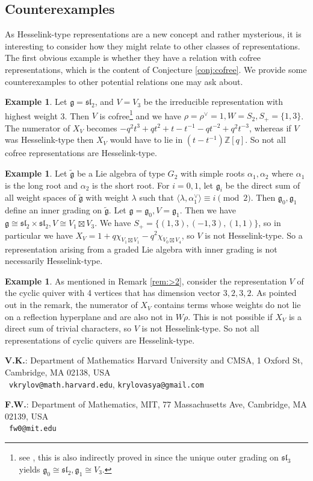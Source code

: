 \documentclass[12pt]{article}
\newcommand{\Z}{\mathbb{Z}}
\renewcommand{\sl}{\mathfrak{sl}}
\theoremstyle{definition}
\newtheorem{example}[theorem]{Example}
\theoremstyle{remark}
\newcommand{\g}{\mathfrak{g}}
\begin{document}
\subsection{Counterexamples}\label{sec:counter}

As Hesselink-type representations are a new concept and rather mysterious, it is interesting to consider how they might relate to other classes of representations. The first obvious example is whether they have a relation with cofree representations, which is the content of Conjecture \ref{conj:cofree}. We provide some counterexamples to other potential relations one may ask about.

\begin{example}
    Let $\g=\sl_2$, and $V=V_3$ be the irreducible representation with highest weight 3. Then $V$ is cofree\footnote{see \cite{littelmann}, this is also indirectly proved in \cite{vinberg} since the unique outer grading on $\sl_3$ yields $\g_0\cong\sl_2,\g_1\cong V_3$.} and we have $\rho=\rho^\vee=1,W=S_2,S_+=\{1,3\}$. The numerator of $X_V$ becomes $-q^2t^3+qt^2+t-t^{-1}-qt^{-2}+q^2t^{-3}$, whereas if $V$ was Hesselink-type then $X_V$ would have to lie in $(t-t^{-1})\Z[q]$. So not all cofree representations are Hesselink-type.
\end{example}

\begin{example}\label{eg:g2}
    Let $\tilde{\g}$ be a Lie algebra of type $G_2$ with simple roots $\alpha_1,\alpha_2$ where $\alpha_1$ is the long root and $\alpha_2$ is the short root. For $i=0,1$, let $\g_i$ be the direct sum of all weight spaces of $\tilde{\g}$ with weight $\lambda$ such that $\langle\lambda,\alpha_1^\vee\rangle\equiv i\pmod 2$. Then $\g_0,\g_1$ define an inner grading on $\tilde{\g}$. Let $\g=\g_0,V=\g_1$. Then we have $\g\cong\sl_2\times\sl_2, V\cong V_1\boxtimes V_3$. We have $S_+=\{(1,3),(-1,3),(1,1)\}$, so in particular we have $X_V=1+q\chi_{V_1\boxtimes V_1}-q^2\chi_{V_0\boxtimes V_4}$, so $V$ is not Hesselink-type. So a representation arising from a graded Lie algebra with inner grading is not necessarily Hesselink-type.
\end{example}

\begin{example}\label{eg:3232}
    As mentioned in Remark \ref{rem:>2}, consider the representation $V$ of the cyclic quiver with 4 vertices that has dimension vector $3,2,3,2$. As pointed out in the remark, the numerator of $X_V$ contains terms whose weights do not lie on a reflection hyperplane and are also not in $W\rho$. This is not possible if $X_V$ is a direct sum of trivial characters, so $V$ is not Hesselink-type. So not all representations of cyclic quivers are Hesselink-type.
\end{example}

\printbibliography

\footnotesize{
{\bf V.K.}: Department of Mathematics Harvard University and CMSA, 1 Oxford St, Cambridge, MA 02138, USA\\
\hphantom{x}\quad\, {\tt vkrylov@math.harvard.edu}, {\tt krylovasya@gmail.com}

{\bf F.W.}: Department of Mathematics, MIT,
77 Massachusetts Ave, Cambridge, MA 02139, USA\\
\hphantom{x}\quad\, {\tt fw0@mit.edu}}
\end{document}
